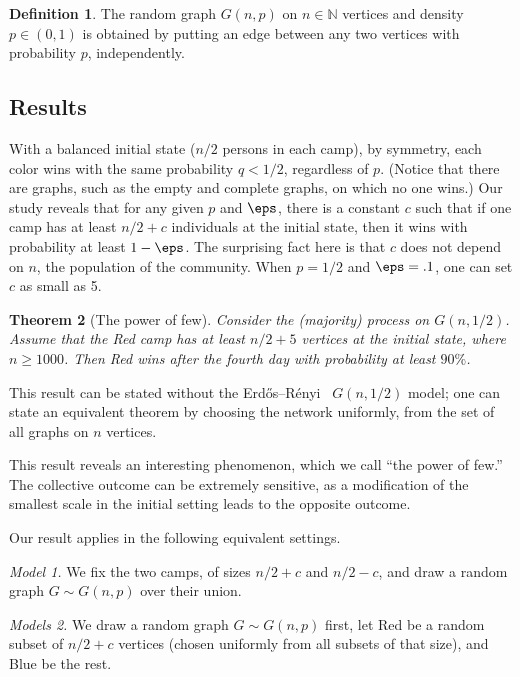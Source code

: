 \documentclass[11pt]{article}
\numberwithin{equation}{section}
\newtheorem{theorem}{Theorem}[section]
\theoremstyle{definition}
\newtheorem{definition}[theorem]{Definition}
\theoremstyle{plain}
\newcommand{\N}{\mathbb N}
\newcommand{\err}{Erd\H{o}s--R{\'e}nyi}
\begin{document}
			
			\begin{definition} The random graph $G(n,p)$ on $n\in \N$ vertices and density $p\in (0, 1)$ is obtained by putting an edge between any two vertices with probability $p$, independently.
			\end{definition}
			
			
			
			\subsection{Results}
			With a balanced initial state ($n/2$ persons in each camp), by symmetry, each color wins with the same  probability $q < 1/2$, regardless of $p$.   (Notice that there are graphs, such as the empty and complete graphs, on which no one wins.)
			Our study reveals  that for any given $p$ and $\eps$, there is  a constant $c$ such that if one camp has at least $n/2 + c$ individuals at the initial state, then
			it wins with probability at least $1- \eps$.  The surprising fact here is that $c$ does not depend on $n$, the population of the community. When $p=1/2$ and $\eps =.1$, one can set
			$c$ as small as 5.
			
			
			\begin{theorem} [The power of few]  \label{thm:const-advantage-ex}
				Consider the  (majority) process on $G(n, 1/2)$. Assume that the Red camp has at least  $n/2 + 5$  vertices at the initial state, where $n \ge 1000$. Then  Red wins after the fourth day with probability at least  $90\%$.
			\end{theorem}
			
			This result can be stated without the
			\err\  %
			$G(n, 1/2)$ %
			model; one can state an equivalent theorem by choosing the network uniformly, from the set of all graphs on $n$ vertices.
			
			This  result reveals an interesting phenomenon, which we call 
			``the power of few.''
			The collective outcome can be extremely sensitive, as a  modification of the smallest scale  in the initial setting leads to
			the opposite outcome.
			
			Our result applies in the following equivalent settings.
			
			\emph{Model 1.} We fix the two camps, of %
			sizes  %
			$n/2 +c$ and $n/2-c$,
			and draw a random graph $G\sim G(n, p)$ over their union.
			
			\emph{Models 2.} We draw a random graph $G \sim G(n, p)$ first, let Red be a random subset of $n/2 +c$ vertices (chosen uniformly from all subsets of that size), and Blue be the rest.
			
\end{document}
